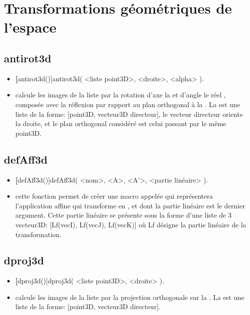  

\section{Transformations géométriques de l'espace} 

\subsection{antirot3d}
\begin{itemize}
 \item \util \textbf[antirot3d()]{antirot3d( <liste point3D>, <droite>, <alpha> )}.
 \item \desc calcule les images de la liste par la rotation d'axe la  et d'angle le réel , composée avec la réflexion par rapport au plan orthogonal à la . La  est une liste de la forme: [point3D, vecteur3D directeur], le vecteur directeur oriente la droite, et le plan orthogonal considéré est celui passant par le même point3D.
\end{itemize}

\subsection{defAff3d}
\begin{itemize}
 \item \util \textbf[defAff3d()]{defAff3d( <nom>, <A>, <A'>, <partie linéaire> )}.
 \item \desc cette fonction permet de créer une macro appelée  qui représentera l'application affine qui transforme  en , et dont la partie linéaire est le dernier argument. Cette partie linéaire se présente sous la forme d'une liste de 3 vecteur3D: [Lf(vecI), Lf(vecJ), Lf(vecK)] où Lf désigne la partie linéaire de la transformation.
\end{itemize}

\subsection{dproj3d}
\begin{itemize}
 \item \util \textbf[dproj3d()]{dproj3d( <liste point3D>, <droite> )}.
 \item \desc calcule les images de la liste par la projection orthogonale sur la . La  est une liste de la forme: [point3D, vecteur3D directeur].
\end{itemize}

